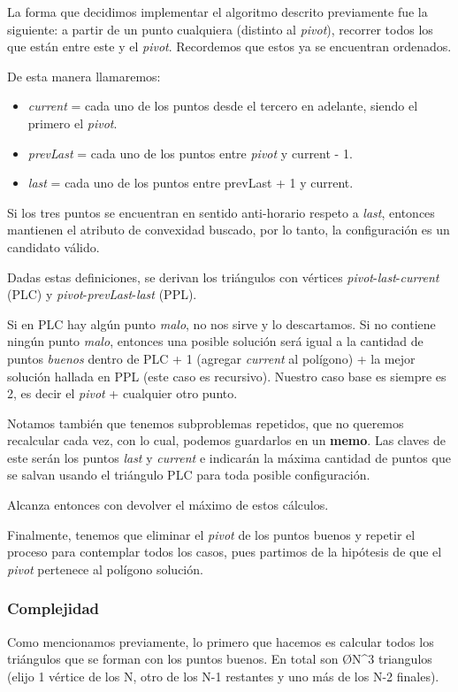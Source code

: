 La forma que decidimos implementar el algoritmo descrito previamente fue la siguiente: a partir de un punto cualquiera (distinto al \textit{pivot}), recorrer todos los que están entre este y el \textit{pivot}. Recordemos que estos ya se encuentran ordenados.

De esta manera llamaremos:
\begin{itemize}
  \item \textit{current} = cada uno de los puntos desde el tercero en adelante, siendo el primero el \textit{pivot}.

  \item \textit{prevLast} = cada uno de los puntos entre \textit{pivot} y current - 1.

  \item \textit{last} = cada uno de los puntos entre prevLast + 1 y current.
\end{itemize}

Si los tres puntos se encuentran en sentido anti-horario respeto a \textit{last}, entonces mantienen el atributo de convexidad buscado, por lo tanto, la configuración es un candidato válido.

Dadas estas definiciones, se derivan los triángulos con vértices \textit{pivot}-\textit{last}-\textit{current} (PLC) y \textit{pivot}-\textit{prevLast}-\textit{last} (PPL).

Si en PLC hay algún punto \textit{malo}, no nos sirve y lo descartamos. Si no contiene ningún punto \textit{malo}, entonces una posible solución será igual a la cantidad de puntos \textit{buenos} dentro de PLC + 1 (agregar \textit{current} al polígono) + la mejor solución hallada en PPL (este caso es recursivo). Nuestro caso base es siempre es 2, es decir el \textit{pivot} + cualquier otro punto.

Notamos también que tenemos subproblemas repetidos, que no queremos recalcular cada vez, con lo cual, podemos guardarlos en un \textbf{memo}. Las claves de este serán los puntos \textit{last} y \textit{current} e indicarán la máxima cantidad de puntos que se salvan usando el triángulo PLC para toda posible configuración.

Alcanza entonces con devolver el máximo de estos cálculos.

Finalmente, tenemos que eliminar el \textit{pivot} de los puntos buenos y repetir el proceso para contemplar todos los casos, pues partimos de la hipótesis de que el \textit{pivot} pertenece al polígono solución.

\subsubsection{Complejidad}
Como mencionamos previamente, lo primero que hacemos es calcular todos los triángulos que se forman con los puntos buenos. En total son \O{N^3} triangulos (elijo 1 vértice de los N, otro de los N-1 restantes y uno más de los N-2 finales).

